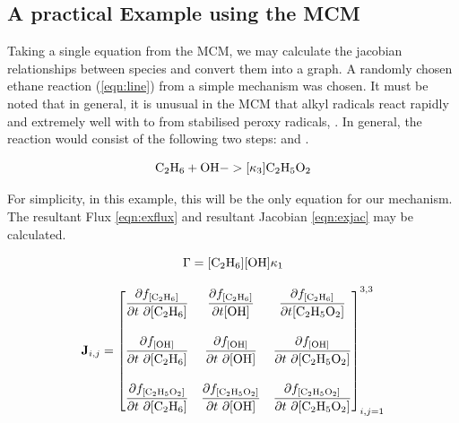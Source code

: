 \subsection{A practical Example using the MCM}\label{sec:jacpractical}

Taking a single equation from the MCM, we may calculate the jacobian relationships between species and convert them into a graph. A randomly chosen ethane reaction (\autoref{eqn:line}) from a simple mechanism was chosen. It must be noted that in general, it is unusual in the MCM that alkyl radicals react rapidly and extremely well with  to from stabilised peroxy radicals, \citep{mcmorigin}. In general, the reaction would consist of the following two steps:
and .

\begin{equation}
\label{eqn:line}
\ce{C2H6} + \ce{OH} ->[\kappa_3] \ce{C2H5O2}
\end{equation}

For simplicity, in this example, this will be the only equation for our mechanism. The resultant Flux \autoref{eqn:exflux} and resultant Jacobian \autoref{eqn:exjac} may be calculated.

\begin{equation}\label{eqn:exflux}
   \Gamma = [\ce{C2H6}][\ce{OH}]\kappa_1 \\[15pt]
\end{equation}

   \begin{eqnarray}
    \mathbf{J}_{i,j} =
 \begin{bmatrix}
   \dfrac{\partial f_{[\ce{C2H6}]}}{\partial t \ \partial {[\ce{C2H6}]}} &
     \dfrac{\partial f_{[\ce{C2H6}]}}{\partial t{[\ce{OH}]}} &
     \dfrac{\partial f_{[\ce{C2H6}]}}{ \partial t{[\ce{C2H5O2}]}} \\[20pt]
   \dfrac{\partial f_{[\ce{OH}]}}{\partial t \ \partial {[\ce{C2H6}]}} &
     \dfrac{\partial f_{[\ce{OH}]}}{\partial t \ \partial {[\ce{OH}]}} &
   \dfrac{\partial f_{[\ce{OH}]}}{\partial t \ \partial {[\ce{C2H5O2}]}} \\[20pt]
   \dfrac{\partial f_{[\ce{C2H5O2}]}}{\partial t \ \partial {[\ce{C2H6}]}} &
     \dfrac{\partial f_{[\ce{C2H5O2}]}}{\partial t \ \partial {[\ce{OH}]}} &
     \dfrac{\partial f_{[\ce{C2H5O2}]}}{\partial t \ \partial {[\ce{C2H5O2}]}}
 \end{bmatrix}_{i,j=1}^{3,3}
 \label{eqn:exjac}
\end{eqnarray}\\


